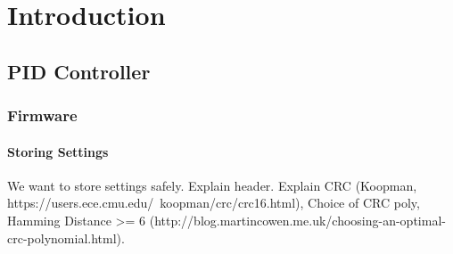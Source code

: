 \chapter{Introduction}
\section{PID Controller}
\subsection{Firmware}
\subsubsection{Storing Settings}
We want to store settings safely. Explain header. Explain CRC (Koopman, https://users.ece.cmu.edu/~koopman/crc/crc16.html), Choice of CRC poly, Hamming Distance >= 6 (http://blog.martincowen.me.uk/choosing-an-optimal-crc-polynomial.html).
